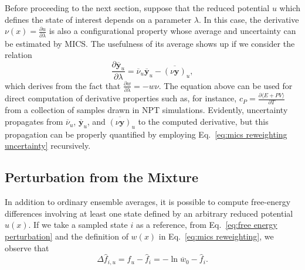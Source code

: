\documentclass[journal=jctcce,manuscript=article]{achemso}
\newcommand{\vt}[1]{\boldsymbol{\mathbf{#1}}}   %
\newcommand{\diff}[2]{\frac{\partial #1}{\partial #2}} %
\newcommand{\avg}[1]{\overline{#1}}             %
\begin{document}
Before proceeding to the next section, suppose that the reduced potential $u$ which defines the state of interest depends on a parameter $\lambda$. In this case, the derivative $\nu(x) = \frac{\partial u}{\partial \lambda}$ is also a configurational property whose average and uncertainty can be estimated by MICS. The usefulness of its average shows up if we consider the relation
\begin{equation*}
\diff{\avg{\vt y}_u}{\lambda} = \avg{\nu}_u \avg{\vt y}_u - \avg{(\nu \vt y)}_u,
\end{equation*}
which derives from the fact that $\frac{\partial w}{\partial \lambda} = - w \nu$. The equation above can be used for direct computation of derivative properties such as, for instance, $c_P = \frac{\partial \langle E + PV \rangle}{\partial T}$ from a collection of samples drawn in NPT simulations. Evidently, uncertainty propagates from $\avg{\nu}_u$, $\avg{\vt y}_u$, and $\avg{(\nu \vt y)}_u$ to the computed derivative, but this propagation can be properly quantified by employing Eq.~\eqref{eq:mics reweighting uncertainty} recursively.

\subsection{Perturbation from the Mixture}

In addition to ordinary ensemble averages, it is possible to compute free-energy differences involving at least one state defined by an arbitrary reduced potential $u(x)$. If we take a sampled state $i$ as a reference, from Eq.~\eqref{eq:free energy perturbation} and the definition of $w(x)$ in Eq.~\eqref{eq:mics reweighting}, we observe that
\begin{equation}
\label{eq:mics fep}
\Delta {\hat f}_{i,u} = {\hat f}_u - {\hat f}_i = -\ln \avg{w}_0 - {\hat f}_i.
\end{equation}
\end{document}
